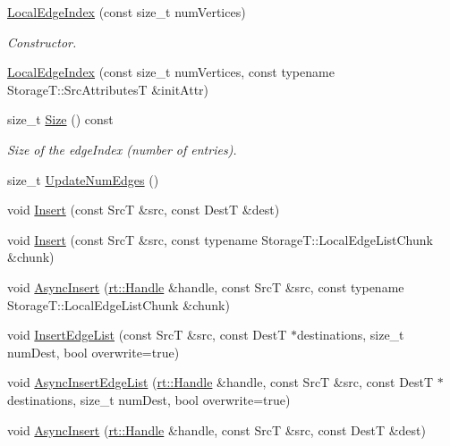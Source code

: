 \begin{DoxyCompactItemize}
\item 
\hyperlink{classshad_1_1LocalEdgeIndex_a273d60cd45332d22f832e7b3e670cfd5}{Local\-Edge\-Index} (const size\-\_\-t num\-Vertices)
\begin{DoxyCompactList}\small\item\em Constructor. \end{DoxyCompactList}\item 
\hyperlink{classshad_1_1LocalEdgeIndex_a794053866bc9b6e8bca74e91ddbe3a63}{Local\-Edge\-Index} (const size\-\_\-t num\-Vertices, const typename Storage\-T\-::\-Src\-Attributes\-T \&init\-Attr)
\item 
size\-\_\-t \hyperlink{classshad_1_1LocalEdgeIndex_a7d5efa4e24545c061f0cffcf860258f2}{Size} () const 
\begin{DoxyCompactList}\small\item\em Size of the edge\-Index (number of entries). \end{DoxyCompactList}\item 
size\-\_\-t \hyperlink{classshad_1_1LocalEdgeIndex_ac0781c3c3f69b567df4e408de2f7edb0}{Update\-Num\-Edges} ()
\item 
void \hyperlink{classshad_1_1LocalEdgeIndex_a5d09cd61ac2f18fc3d3c501627db6583}{Insert} (const Src\-T \&src, const Dest\-T \&dest)
\item 
void \hyperlink{classshad_1_1LocalEdgeIndex_ab5b081f19afdb5a27a9c1a97fb17523a}{Insert} (const Src\-T \&src, const typename Storage\-T\-::\-Local\-Edge\-List\-Chunk \&chunk)
\item 
void \hyperlink{classshad_1_1LocalEdgeIndex_a45c853cfbf5ef44d01d6ef73edb593fb}{Async\-Insert} (\hyperlink{classshad_1_1rt_1_1Handle}{rt\-::\-Handle} \&handle, const Src\-T \&src, const typename Storage\-T\-::\-Local\-Edge\-List\-Chunk \&chunk)
\item 
void \hyperlink{classshad_1_1LocalEdgeIndex_a934108b32fc2a485011fe574f1fd759c}{Insert\-Edge\-List} (const Src\-T \&src, const Dest\-T $\ast$destinations, size\-\_\-t num\-Dest, bool overwrite=true)
\item 
void \hyperlink{classshad_1_1LocalEdgeIndex_a0de955e293214c0e56ed8d4659007ad5}{Async\-Insert\-Edge\-List} (\hyperlink{classshad_1_1rt_1_1Handle}{rt\-::\-Handle} \&handle, const Src\-T \&src, const Dest\-T $\ast$destinations, size\-\_\-t num\-Dest, bool overwrite=true)
\item 
void \hyperlink{classshad_1_1LocalEdgeIndex_accf434b5281799869f3033280854e064}{Async\-Insert} (\hyperlink{classshad_1_1rt_1_1Handle}{rt\-::\-Handle} \&handle, const Src\-T \&src, const Dest\-T \&dest)

\end{DoxyCompactItemize}
